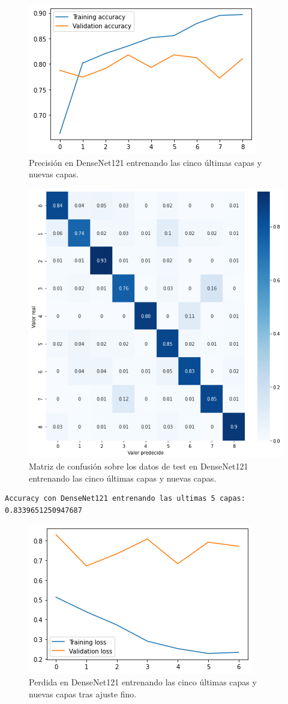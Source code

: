 \begin{figure}[H]
  \centering
  \includegraphics[width=0.5\linewidth]{Imagenes/entrenamiento_redes/5-ult/densenet_5ult_acc.png}
  \caption{Precisión en DenseNet121 entrenando las cinco últimas capas y nuevas capas.}
\end{figure}

\begin{figure}[H]
  \centering
  \includegraphics[width=0.5\linewidth]{Imagenes/entrenamiento_redes/5-ult/densenet_5ult_matriz.png}
  \caption{Matriz de confusión sobre los datos de test en DenseNet121 entrenando las cinco últimas capas y nuevas capas.}
\end{figure}


\begin{lstlisting}
Accuracy con DenseNet121 entrenando las ultimas 5 capas: 0.8339651250947687
\end{lstlisting}



\begin{figure}[H]
  \centering
  \includegraphics[width=0.5\linewidth]{Imagenes/entrenamiento_redes/5-ult/densenet_5fine_loss.png}
  \caption{Perdida en DenseNet121 entrenando las cinco últimas capas y nuevas capas tras ajuste fino.}
\end{figure}

